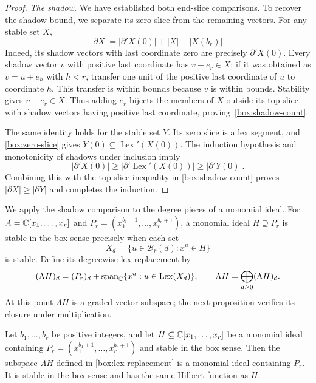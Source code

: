 \begin{proof}
\smallskip\noindent
\emph{The shadow.}
We have established both end-slice comparisons.  To recover the
shadow bound, we separate its zero slice from the remaining vectors.
For any stable set \(X\),
\begin{equation}
 \label{box:shadow-count}
 |\partial X|=|\partial'X(0)|+|X|-|X(b_r)|.
\end{equation}
Indeed, its shadow vectors with last coordinate zero are precisely
\(\partial'X(0)\).  Every shadow vector \(v\) with positive last
coordinate has \(v-e_r\in X\): if it was obtained as \(v=u+e_h\)
with \(h<r\), transfer one unit of the positive last coordinate of
\(u\) to coordinate \(h\).  This transfer is within bounds because
\(v\) is within bounds.  Stability gives \(v-e_r\in X\).
Thus adding \(e_r\) bijects the members of \(X\) outside its top
slice with shadow vectors having positive last coordinate,
proving~\eqref{box:shadow-count}.

The same identity holds for the stable set \(Y\).  Its zero slice
is a lex segment, and \eqref{box:zero-slice} gives
\(Y(0)\subseteq\operatorname{Lex}'(X(0))\).  The induction
hypothesis and monotonicity of shadows under inclusion imply
\[
 |\partial'X(0)|
 \ge\bigl|\partial'\operatorname{Lex}'(X(0))\bigr|
 \ge|\partial'Y(0)|.
\]
Combining this with the top-slice inequality in
\eqref{box:shadow-count} proves \(|\partial X|\ge|\partial Y|\)
and completes the induction.
\end{proof}

We apply the shadow comparison to the degree pieces of a monomial
ideal.  For \(A=\mathbb C[x_1,\ldots,x_r]\) and
\(P_r=(x_1^{b_1+1},\ldots,x_r^{b_r+1})\), a monomial ideal
\(H\supseteq P_r\) is stable in the box sense precisely when each
set
\[
 X_d=\{u\in\mathcal B_r(d):x^u\in H\}
\]
is stable.  Define its degreewise lex replacement by
\begin{equation}
 \label{box:lex-replacement}
 (\Lambda H)_d
   =(P_r)_d+
     \operatorname{span}_{\mathbb C}
        \{x^u:u\in\operatorname{Lex}(X_d)\},
 \qquad
 \Lambda H=\bigoplus_{d\ge0}(\Lambda H)_d.
\end{equation}
At this point \(\Lambda H\) is a graded vector subspace; the next
proposition verifies its closure under multiplication.

\begin{proposition}
\label{box:ideal}
Let \(b_1,\ldots,b_r\) be positive integers, and let
\(H\subseteq\mathbb C[x_1,\ldots,x_r]\) be a monomial ideal containing
\(P_r=(x_1^{b_1+1},\ldots,x_r^{b_r+1})\) and stable in the box
sense.  Then the subspace \(\Lambda H\) defined in
\eqref{box:lex-replacement} is a monomial ideal containing \(P_r\).
It is stable in the box sense and has the same Hilbert function as
\(H\).
\end{proposition}

